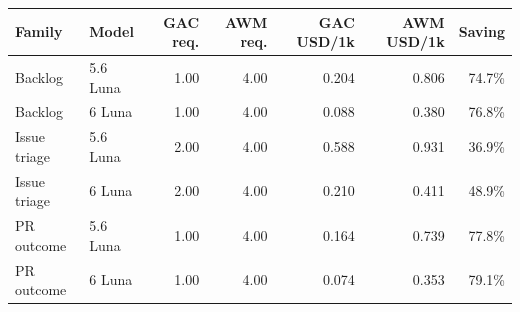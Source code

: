 \begin{tabular}{llrrrrr}
\toprule
Family & Model & GAC req. & AWM req. & GAC USD/1k & AWM USD/1k & Saving \\
\midrule
Backlog & 5.6 Luna & 1.00 & 4.00 & 0.204 & 0.806 & 74.7\% \\
Backlog & 6 Luna & 1.00 & 4.00 & 0.088 & 0.380 & 76.8\% \\
Issue triage & 5.6 Luna & 2.00 & 4.00 & 0.588 & 0.931 & 36.9\% \\
Issue triage & 6 Luna & 2.00 & 4.00 & 0.210 & 0.411 & 48.9\% \\
PR outcome & 5.6 Luna & 1.00 & 4.00 & 0.164 & 0.739 & 77.8\% \\
PR outcome & 6 Luna & 1.00 & 4.00 & 0.074 & 0.353 & 79.1\% \\
\bottomrule
\end{tabular}
